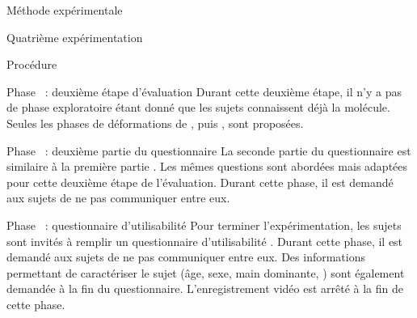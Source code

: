 \documentclass[myfrancais,ngerman,english,frenchb]{mythesis}
\begin{document}
\begin{mychapter}{Méthode expérimentale}
\begin{mysection}{Quatrième expérimentation}
\begin{mysubsection}{Procédure}
\begin{myparagraph}{Phase~ : deuxième étape d'évaluation}
					Durant cette deuxième étape, il n'y a pas de phase exploratoire étant donné que les sujets connaissent déjà la molécule.
					Seules les phases de déformations de , \myUbiquitin puis \myNusENusG, sont proposées.
				\end{myparagraph}
				\begin{myparagraph}{Phase~ : deuxième partie du questionnaire}
					La seconde partie du questionnaire est similaire à la première partie .
					Les mêmes questions sont abordées mais adaptées pour cette deuxième étape de l'évaluation.
					Durant cette phase, il est demandé aux sujets de ne pas communiquer entre eux.
				\end{myparagraph}
				\begin{myparagraph}{Phase~ : questionnaire d'utilisabilité}
					Pour terminer l'expérimentation, les sujets sont invités à remplir un questionnaire d'utilisabilité .
					Durant cette phase, il est demandé aux sujets de ne pas communiquer entre eux.
					Des informations permettant de caractériser le sujet (âge, sexe, main dominante, \myetc) sont également demandée à la fin du questionnaire.
					L'enregistrement vidéo est arrêté à la fin de cette phase.
				\end{myparagraph}
			\end{mysubsection}
		\end{mysection}
	\end{mychapter}
\end{document}
